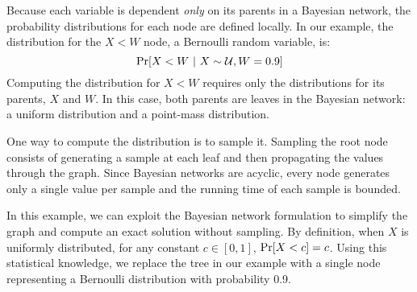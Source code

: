 Because each variable is
dependent \emph{only} on its parents in a Bayesian network, the probability
distributions for each node are defined locally. In our example, the
distribution for the $X < W$ node, a Bernoulli random variable, is:
%
$$\Pr\!\left[X<W~|~X \sim \mathcal{U}, W=0.9\right]$$
%
Computing the distribution for $X < W$ requires only the
distributions for its
parents, $X$ and $W$. In this case, both parents are leaves in the Bayesian
network: a uniform distribution and a point-mass distribution.

One way to compute the distribution is to sample it. Sampling the root node
consists of generating a sample at each leaf and then propagating the values
through the graph.
Since Bayesian networks are acyclic, every node generates
only a single value per sample and the running time of each sample is
bounded.

In this example, we can exploit the Bayesian network formulation
to simplify the graph and compute an exact solution without
sampling. By definition, when $X$ is uniformly distributed,
for any constant $c \in [0,1]$, $\Pr\!\left[X < c\right] = c$.  Using this
statistical knowledge, we replace the tree in our example with a
single node representing a Bernoulli distribution with probability
0.9.



